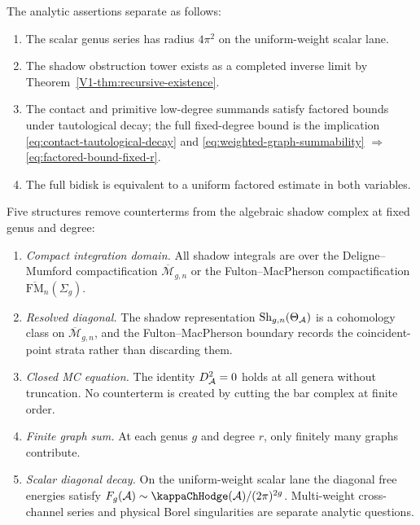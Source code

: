 \begin{remark}
The analytic assertions separate as follows:
\begin{enumerate}[label=\textup{(\alph*)}]
\item The scalar genus series has radius $4\pi^2$ on the
uniform-weight scalar lane.
\item The shadow obstruction tower exists as a completed inverse
limit by Theorem~\ref{V1-thm:recursive-existence}.
\item The contact and primitive low-degree summands satisfy factored
bounds under tautological decay; the full fixed-degree bound is the
implication \eqref{eq:contact-tautological-decay} and
\eqref{eq:weighted-graph-summability}
$\Rightarrow$ \eqref{eq:factored-bound-fixed-r}.
\item The full bidisk is equivalent to a uniform factored estimate in
both variables.
\end{enumerate}
\end{remark}

\begin{remark}
Five structures remove counterterms from the algebraic shadow complex
at fixed genus and degree:
\begin{enumerate}[label=\textup{(\arabic*)}]
\item \emph{Compact integration domain.} All shadow integrals are over the Deligne--Mumford compactification $\overline{\mathcal{M}}_{g,n}$ or the Fulton--MacPherson compactification $\overline{\mathrm{FM}}_n(\Sigma_g)$.
\item \emph{Resolved diagonal.} The shadow representation $\operatorname{Sh}_{g,n}(\Theta_{\mathcal{A}})$ is a cohomology class on $\overline{\mathcal{M}}_{g,n}$, and the Fulton--MacPherson boundary records the coincident-point strata rather than discarding them.
\item \emph{Closed MC equation.} The identity $D_{\mathcal{A}}^2 = 0$ holds at all genera without truncation. No counterterm is created by cutting the bar complex at finite order.
\item \emph{Finite graph sum.} At each genus $g$ and degree $r$, only finitely many graphs contribute.
\item \emph{Scalar diagonal decay.} On the uniform-weight scalar lane the diagonal free energies satisfy $F_g(\cA) \sim \kappaChHodge(\cA)/(2\pi)^{2g}$. Multi-weight cross-channel series and physical Borel singularities are separate analytic questions.
\end{enumerate}
\end{remark}

